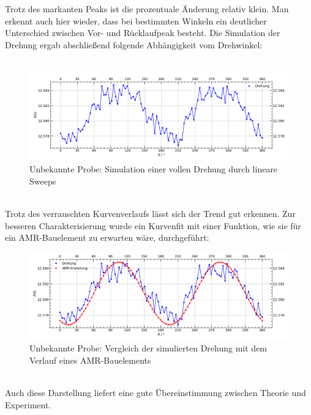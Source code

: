 \documentclass[german,  %
parskip=full,  %
]{scrartcl}
\begin{document}
Trotz des markanten Peaks ist die prozentuale Änderung relativ klein. Man erkennt auch hier wieder, dass bei bestimmten Winkeln ein deutlicher Unterschied zwischen Vor- und Rücklaufpeak besteht. Die Simulation der Drehung ergab abschließend folgende Abhängigkeit vom Drehwinkel:  \\\\
\begin{figure}[h!]\centering
\includegraphics[width=\textwidth]{Probe3_Drehung.png}
\caption{Unbekannte Probe: Simulation einer vollen Drehung durch lineare Sweeps}
\end{figure}  \\
Trotz des verrauschten Kurvenverlaufs lässt sich der Trend gut erkennen. Zur besseren Charakterisierung wurde ein Kurvenfit mit einer Funktion, wie sie für ein AMR-Bauelement zu erwarten wäre, durchgeführt: \\
\begin{figure}[h!]\centering
\includegraphics[width=\textwidth]{Probe3_Drehung_vs_AMR_Erwartung.png}
\caption{Unbekannte Probe: Vergleich der simulierten Drehung mit dem Verlauf eines AMR-Bauelements}
\end{figure} \\
Auch diese Darstellung liefert eine gute Übereinstimmung zwischen Theorie und Experiment.
\end{document}
